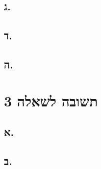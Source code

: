 \documentclass{article}
\begin{document}
\subsection*{ג.}


\subsection*{ד.}



\subsection*{ה.}

\section*{תשובה לשאלה 3}

\subsection*{א.}


\subsection*{ב.}
\end{document}
